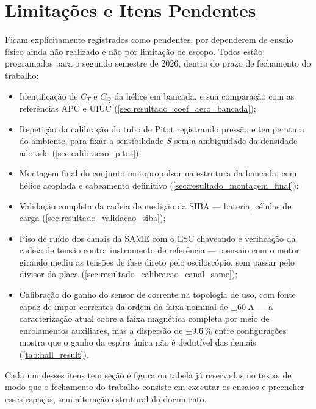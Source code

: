 \section{Limitações e Itens Pendentes}

Ficam explicitamente registrados como pendentes, por dependerem de ensaio
físico ainda não realizado e não por limitação de escopo. Todos estão
programados para o segundo semestre de \num{2026}, dentro do prazo de
fechamento do trabalho:

\begin{itemize}
    \item Identificação de $C_T$ e $C_Q$ da hélice em bancada, e sua
    comparação com as referências APC e UIUC
    (\autoref{sec:resultado_coef_aero_bancada});
    \item Repetição da calibração do tubo de Pitot registrando pressão e
    temperatura do ambiente, para fixar a sensibilidade $S$ sem a
    ambiguidade da densidade adotada (\autoref{sec:calibracao_pitot});
    \item Montagem final do conjunto motopropulsor na estrutura da bancada,
    com hélice acoplada e cabeamento definitivo
    (\autoref{sec:resultado_montagem_final});
    \item Validação completa da cadeia de medição da SIBA --- bateria,
    células de carga (\autoref{sec:resultado_validacao_siba});
    \item Piso de ruído dos canais da SAME com o ESC chaveando e
    verificação da cadeia de tensão contra instrumento de referência --- o
    ensaio com o motor girando mediu as tensões de fase direto pelo
    osciloscópio, sem passar pelo divisor da placa
    (\autoref{sec:resultado_calibracao_canal_same});
    \item Calibração do ganho do sensor de corrente na topologia de uso, com
    fonte capaz de impor correntes da ordem da faixa nominal de
    $\pm\SI{60}{\ampere}$ --- a caracterização atual cobre a faixa magnética
    completa por meio de enrolamentos auxiliares, mas a dispersão de
    $\pm\SI{9,6}{\percent}$ entre configurações mostra que o ganho da espira
    única não é dedutível das demais (\autoref{tab:hall_result}).
\end{itemize}

Cada um desses itens tem seção e figura ou tabela já reservadas no texto, de
modo que o fechamento do trabalho consiste em executar os ensaios e preencher
esses espaços, sem alteração estrutural do documento.
